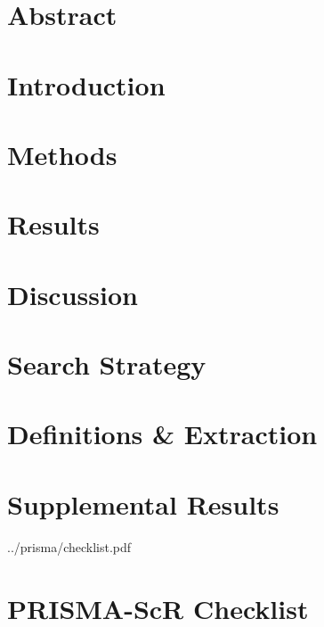\documentclass{article}
\begin{document}
\maketitle
\clearpage
\section*{Abstract}
\clearpage
\section{Introduction} \label{s:intro} 
\section{Methods}      \label{s:meth}  
\section{Results}      \label{s:res}   
\section{Discussion}   \label{s:disc}  
\clearpage
\printbibliography
\clearpage

\appendix
\clearpage
\section{Search Strategy}           \label{a:search}    \clearpage
\section{Definitions \& Extraction} \label{a:defs}        \clearpage
\section{Supplemental Results}      \label{a:results}  \clearpage
{}
{../prisma/checklist.pdf}
{\section{PRISMA-ScR Checklist}\label{a:prisma}}
\end{document}
